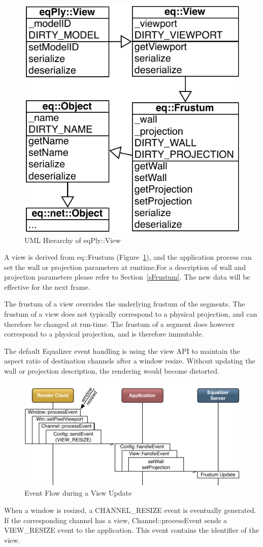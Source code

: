 \documentclass[10pt,a4]{scrartcl}
\newcommand{\fig}[1]{Figure~\ref{#1}}
\newcommand{\sref}[1]{Section~\ref{#1}}
\begin{document}
\begin{figure}
  \includegraphics[width=.382\textwidth]{images/viewUML.pdf}
  {\caption{\label{fViewUML}UML Hierarchy of \textsf{eqPly::View}}}
\end{figure}
A view is derived from \textsf{eq::Frustum} (\fig{fViewUML}), and the
application process can set the wall or projection parameters at
runtime.For a description of wall and projection parameters please refer
to \sref{sFrustum}. The new data will be effective for the next frame.

The frustum of a view overrides the underlying frustum of the
segments. The frustum of a view does not typically correspond to a
physical projection, and can therefore be changed at run-time. The
frustum of a segment does however correspond to a physical projection,
and is therefore immutable.

The default Equalizer event handling is using the view API to maintain
the aspect ratio of destination channels after a window resize. Without
updating the wall or projection description, the rendering would become
distorted.

\begin{figure}
  \includegraphics[width=.618\textwidth]{images/viewUpdate.pdf}
  {\caption{\label{fViewUpdate}Event Flow during a View Update}}
\end{figure}
When a window is resized, a \textsf{CHANNEL\_RESIZE} event is eventually
generated. If the corresponding channel has a view,
\textsf{Channel::processEvent} sends a \textsf{VIEW\_RESIZE} event to
the application. This event contains the identifier of the view. 
\end{document}
